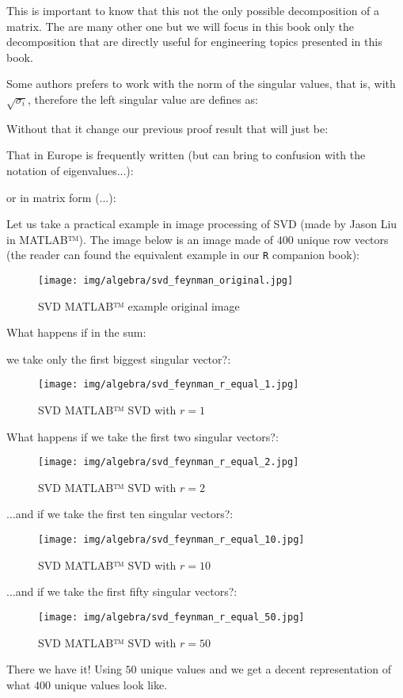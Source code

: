 	This is important to know that this not the only possible decomposition of a matrix. The are many other one but we will focus in this book only the decomposition that are directly useful for engineering topics presented in this book.
	\begin{tcolorbox}[title=Remark,colframe=black,arc=10pt]
	Some authors prefers to work with the norm of the singular values, that is, with $\sqrt{\sigma_i}$, therefore the left singular value are defines as:
	
	Without that it change our previous proof result that will just be:
	
	That in Europe is frequently written (but can bring to confusion with the notation of eigenvalues...):
	
	or in matrix form (...):
	
	\end{tcolorbox}
	Let us take a practical example in image processing of SVD (made by Jason Liu in MATLAB™). The image below is an image made of $400$ unique row vectors (the reader can found the equivalent example in our \texttt{R} companion book):
	\begin{figure}[H]
		\centering
		\texttt{[image: img/algebra/svd\_feynman\_original.jpg]}
		\caption{SVD MATLAB™ example original image}
	\end{figure}
	What happens if in the sum:
	
	we take only the first biggest singular vector?:
	\begin{figure}[H]
		\centering
		\texttt{[image: img/algebra/svd\_feynman\_r\_equal\_1.jpg]}
		\caption[]{SVD MATLAB™ SVD with $r=1$}
	\end{figure}
	What happens if we take the first two singular vectors?:
	\begin{figure}[H]
		\centering
		\texttt{[image: img/algebra/svd\_feynman\_r\_equal\_2.jpg]}
		\caption[]{SVD MATLAB™ SVD with $r=2$}
	\end{figure}
	...and if we take the first ten singular vectors?:
	\begin{figure}[H]
		\centering
		\texttt{[image: img/algebra/svd\_feynman\_r\_equal\_10.jpg]}
		\caption[]{SVD MATLAB™ SVD with $r=10$}
	\end{figure}
	...and if we take the first fifty singular vectors?:
	\begin{figure}[H]
		\centering
		\texttt{[image: img/algebra/svd\_feynman\_r\_equal\_50.jpg]}
		\caption[]{SVD MATLAB™ SVD with $r=50$}
	\end{figure}
	There we have it! Using $50$ unique values and we get a decent representation of what $400$ unique values look like.
	
